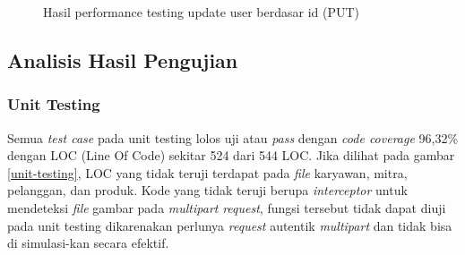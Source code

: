 \begin{figure}[H]
  {\par}
  \caption{Hasil performance testing update user berdasar id (PUT)}
  \label{update-user-testing}
\end{figure}

\newpage


\subsection{Analisis Hasil Pengujian}
\subsubsection{Unit Testing}
Semua \textit{test case} pada unit testing lolos uji atau \textit{pass} dengan \textit{code coverage} 96,32\% dengan LOC (Line Of Code) sekitar 524 dari 544 LOC. Jika dilihat pada gambar \ref{unit-testing}, LOC yang tidak teruji terdapat pada \textit{file} karyawan, mitra, pelanggan, dan produk. Kode yang tidak teruji berupa \textit{interceptor} untuk mendeteksi \textit{file} gambar pada \textit{multipart} \textit{request}, fungsi tersebut tidak dapat diuji pada unit testing dikarenakan perlunya \textit{request} autentik \textit{multipart} dan tidak bisa di simulasi-kan secara efektif.

